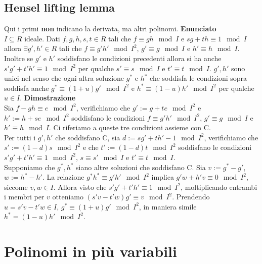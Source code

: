 \documentclass[a4paper,NoNotes,GeneralMath]{stdmdoc}
\newcommand{\Enunciato}{\vskip 0.05cm \noindent \textbf{Enunciato} \\ }
\renewcommand{\Dimostrazione}{\vskip 0.05cm \noindent \textbf{Dimostrazione} \\ }
\begin{document}
	\subsection{Hensel lifting lemma}
	Qui i primi {\bf non} indicano la derivata, ma altri polinomi.
	\Enunciato $I \subseteq R$ ideale. Dati $f,g,h,s,t \in R$ tali che $f \equiv gh \mod I$ e $sg + th \equiv 1 \mod I$ allora $\exists g',h' \in R$ tali che $f \equiv g'h' \mod I^2$, $g' \equiv g \mod I$ e $h' \equiv h \mod I$. Inoltre se $g'$ e $h'$ soddisfano le condizioni precedenti allora si ha anche $s'g'+t'h' \equiv 1 \mod I^2$ per qualche $s' \equiv s \mod I$ e $t' \equiv t \mod I$. $g',h'$ sono unici nel senso che ogni altra soluzione $g^{*}$ e $h^{*}$ che soddisfa le condizioni sopra soddisfa anche $g^{*} \equiv (1+u) g' \mod I^2$ e $h^{*} \equiv (1-u) h' \mod I^2$ per qualche $u \in I$.
	\Dimostrazione Sia $f - gh \equiv e \mod I^2$, verifichiamo che $g' := g + te \mod I^2$ e $h' := h + se \mod I^2$ soddisfano le condizioni $f \equiv g'h' \mod I^2$, $g' \equiv g \mod I$ e $h' \equiv h \mod I$. Ci riferiamo a queste tre condizioni assieme con C. \\
	Per tutti i $g', h'$ che soddisfano C, sia $d := sg' + th' -1 \mod I^2$, verifichiamo che $s' := (1-d) s \mod I^2$ e che $t' := (1-d) t \mod I^2$ soddisfano le condizioni $s'g' + t'h' \equiv 1 \mod I^2$, $s \equiv s' \mod I$ e $t' \equiv t \mod I$. \\
	Supponiamo che $g^{*}, h^{*}$ siano altre soluzioni che soddisfano C. Sia $v := g^{*} - g'$, $w := h^{*} - h'$. La relazione $g^{*}h^{*} \equiv g'h' \mod I^2$ implica $g'w+h'v \equiv 0 \mod I^2$, siccome $v, w \in I$. Allora visto che $s'g'+t'h' \equiv 1 \mod I^2$, moltiplicando entrambi i membri per $v$ otteniamo $(s'v-t'w)g' \equiv v \mod I^2$. Prendendo $u = s'v-t'w \in I$, $g^{*} \equiv (1+u)g' \mod I^2$, in maniera simile $h^{*} = (1-u)h' \mod I^2$.

	\section*{Polinomi in più variabili}
\end{document}
